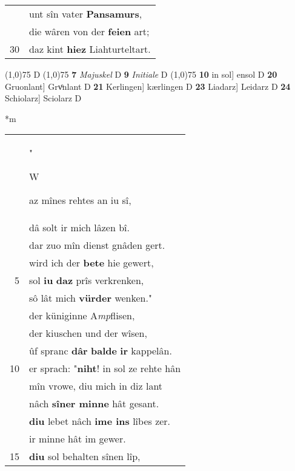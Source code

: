 \documentclass[8pt,a4paper,notitlepage]{article}
\begin{document}
\begin{table}[ht]
\begin{minipage}[t]{0.5\linewidth}
\begin{tabular}{rl}
 & unt sîn vater \textbf{Pansamurs},\\ 
 & die wâren von der \textbf{feien} art;\\ 
30 & daz kint \textbf{hiez} Liahturteltart.\\ 
\end{tabular}
\scriptsize
\line(1,0){75} \newline
D \newline
\line(1,0){75} \newline
\textbf{7} \textit{Majuskel} D  \textbf{9} \textit{Initiale} D  \newline
\line(1,0){75} \newline
\textbf{10} in sol] ensol D \textbf{20} Gruonlant] Grvͦnlant D \textbf{21} Kerlingen] kærlingen D \textbf{23} Liadarz] Leidarz D \textbf{24} Schiolarz] Sciolarz D \newline
\end{minipage}
\hspace{0.5cm}
\begin{minipage}[t]{0.5\linewidth}
\small
\begin{center}*m
\end{center}
\begin{tabular}{rl}
 & "\begin{large}W\end{large}az mînes rehtes an iu sî,\\ 
 & dâ solt ir mich lâzen bî.\\ 
 & dar zuo mîn dienst gnâden gert.\\ 
 & wird ich der \textbf{bete} hie gewert,\\ 
5 & sol \textbf{iu} \textbf{daz} prîs verkrenken,\\ 
 & sô lât mich \textbf{vürder} wenken."\\ 
 & der küniginne A\textit{mp}flisen,\\ 
 & der kiuschen und der wîsen,\\ 
 & ûf spranc \textbf{dâr} \textbf{balde} \textbf{ir} kappelân.\\ 
10 & er sprach: "\textbf{niht}! in sol ze rehte hân\\ 
 & mîn vrowe, diu mich in diz lant\\ 
 & nâch \textbf{sîner minne} hât gesant.\\ 
 & \textbf{diu} lebet nâch \textbf{ime ins} lîbes zer.\\ 
 & ir minne hât  im gewer.\\ 
15 & \textbf{diu} sol behalten sînen lîp,\\ 

\end{tabular}
\end{minipage}
\end{table}
\end{document}
